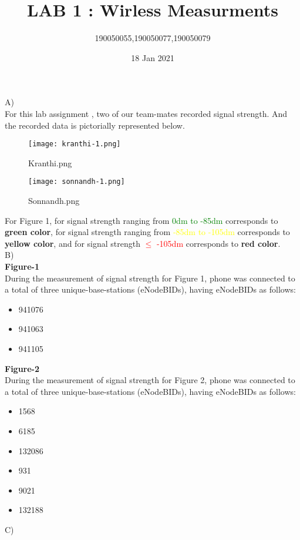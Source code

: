 \documentclass[11pt,a4paper]{article}
\title{\textbf{LAB 1 : Wirless Measurments}}
\author{190050055,190050077,190050079}
\date{18 Jan 2021}
\begin{document}
\maketitle 


\newpage
{\huge A)}\\

\vspace{0.5cm}
For this lab assignment , two of our team-mates recorded signal strength. And the recorded data is pictorially represented below. 

\begin{SCfigure}[0.5][h]
\caption{Kranthi.png}
\texttt{[image: kranthi-1.png]}
\end{SCfigure}
\begin{SCfigure}[0.5][h]
\caption{Sonnandh.png}
\texttt{[image: sonnandh-1.png]}
\end{SCfigure}
For Figure 1, for signal strength ranging from \textcolor{green}{0dm to -85dm}  corresponds to \textbf{green color}, for signal strength ranging from \textcolor{yellow}{-85dm to -105dm} corresponds to \textbf{yellow color}, and for signal strength  \textcolor{red}{$\leq$ -105dm} corresponds to \textbf{red color}. 
\\
\vspace{8pt}
\newpage
{\huge B)}\\

\vspace{0.5cm}
\textbf{\Large{Figure-1}}\\
During the measurement of signal strength for Figure 1, phone was connected to a total of three unique-base-stations (eNodeBIDs), having eNodeBIDs as follows:
\vspace{-8pt}
\begin{itemize}[itemsep = -2 mm]
\item 941076
\item 941063
\item 941105
\end{itemize}
\vspace{1cm}
\textbf{\Large{Figure-2}}\\
 During the measurement of signal strength for Figure 2, phone was connected to a total of three unique-base-stations (eNodeBIDs), having eNodeBIDs as follows:
 \vspace{-8pt}
 \begin{itemize}[itemsep = -2mm]
     \item1568
 \item6185
 \item132086
 \item931
 \item9021
 \item132188
 \end{itemize}
 \vspace{1cm}
 {\huge C)}\\
\end{document}
